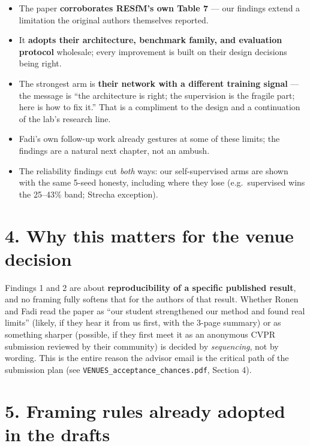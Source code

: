 \documentclass[11pt]{article}
\newcommand{\code}[1]{\texttt{\small #1}}
\begin{document}
\begin{itemize}[leftmargin=1.6em,itemsep=4pt]
\item The paper \textbf{corroborates RESfM's own Table 7} --- our findings extend a limitation
the original authors themselves reported.
\item It \textbf{adopts their architecture, benchmark family, and evaluation protocol}
wholesale; every improvement is built on their design decisions being right.
\item The strongest arm is \textbf{their network with a different training signal} --- the
message is ``the architecture is right; the supervision is the fragile part; here is how to fix
it.'' That is a compliment to the design and a continuation of the lab's research line.
\item Fadi's own follow-up work already gestures at some of these limits; the findings are a
natural next chapter, not an ambush.
\item The reliability findings cut \emph{both} ways: our self-supervised arms are shown with
the same 5-seed honesty, including where they lose (e.g.\ supervised wins the 25--43\% band;
Strecha exception).
\end{itemize}

\section*{4. Why this matters for the venue decision}

Findings 1 and 2 are about \textbf{reproducibility of a specific published result}, and no
framing fully softens that for the authors of that result. Whether Ronen and Fadi read the
paper as ``our student strengthened our method and found real limits'' (likely, if they hear it
from us first, with the 3-page summary) or as something sharper (possible, if they first meet
it as an anonymous CVPR submission reviewed by their community) is decided by \emph{sequencing},
not by wording. This is the entire reason the advisor email is the critical path of the
submission plan (see \code{VENUES\_acceptance\_chances.pdf}, Section 4).

\section*{5. Framing rules already adopted in the drafts}
\end{document}
